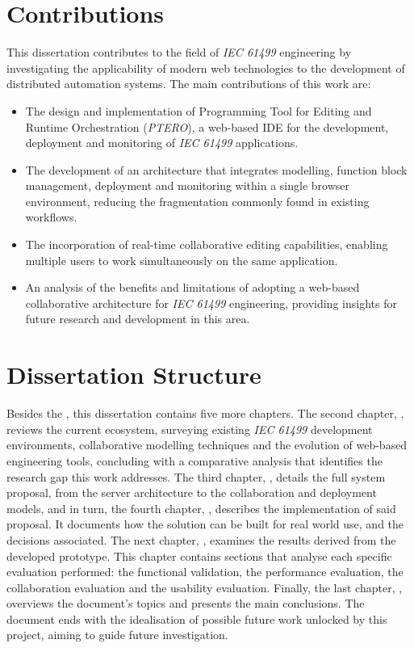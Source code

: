 \section{Contributions}
This dissertation contributes to the field of \textit{IEC 61499} engineering by investigating the applicability of modern web technologies to the development of distributed automation systems. The main contributions of this work are:

\begin{itemize}
\item The design and implementation of Programming Tool for Editing and Runtime Orchestration (\textit{PTERO}), a web-based \ac{IDE} for the development, deployment and monitoring of \textit{IEC 61499} applications.

\item The development of an architecture that integrates modelling, function block management, deployment and monitoring within a single browser environment, reducing the fragmentation commonly found in existing workflows.

\item The incorporation of real-time collaborative editing capabilities, enabling multiple users to work simultaneously on the same application.

\item An analysis of the benefits and limitations of adopting a web-based collaborative architecture for \textit{IEC 61499} engineering, providing insights for future research and development in this area.
\end{itemize}

\section{Dissertation Structure}
\label{sec:structure}
Besides the , this dissertation contains five more chapters. The second chapter, , reviews the current ecosystem, surveying existing \textit{IEC 61499} development environments, collaborative modelling techniques and the evolution of web-based engineering tools, concluding with a comparative analysis that identifies the research gap this work addresses. The third chapter, , details the full system proposal, from the server architecture to the collaboration and deployment models, and in turn, the fourth chapter, , describes the implementation of said proposal. It documents how the solution can be built for real world use, and the decisions associated. The next chapter, , examines the results derived from the developed prototype. This chapter contains sections that analyse each specific evaluation performed: the functional validation, the performance evaluation, the collaboration evaluation and the usability evaluation. Finally, the last chapter, , overviews the document's topics and presents the main conclusions. The document ends with the idealisation of possible future work unlocked by this project, aiming to guide future investigation.
